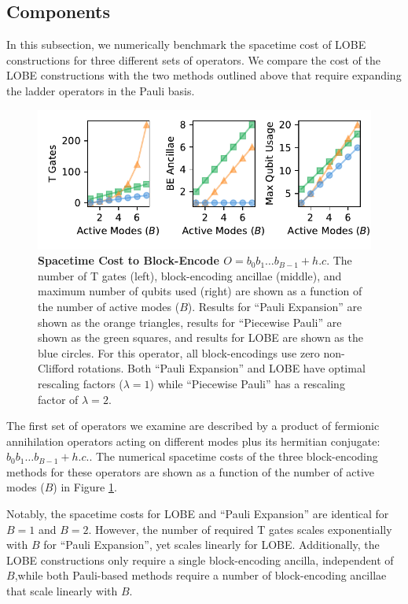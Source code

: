 
\subsection{Components}

In this subsection, we numerically benchmark the spacetime cost of LOBE constructions for three different sets of operators.
We compare the cost of the LOBE constructions with the two methods outlined above that require expanding the ladder operators in the Pauli basis.

\begin{figure}
    \centering
    \includegraphics[width=12cm]{figures/fermionic-hc-comparison.pdf}
    \caption{
        \textbf{Spacetime Cost to Block-Encode $O = b_0 b_1 \hdots b_{B-1} + h.c.$}
        The number of T gates (left), block-encoding ancillae (middle), and maximum number of qubits used (right) are shown as a function of the number of active modes ($B$).
        Results for ``Pauli Expansion'' are shown as the orange triangles, results for ``Piecewise Pauli'' are shown as the green squares, and results for LOBE are shown as the blue circles.
        For this operator, all block-encodings use zero non-Clifford rotations.
        Both ``Pauli Expansion'' and LOBE have optimal rescaling factors ($\lambda = 1$) while ``Piecewise Pauli'' has a rescaling factor of $\lambda = 2$.
    }
    \label{fig:fermionic-hc-comparison}
\end{figure}

The first set of operators we examine are described by a product of fermionic annihilation operators acting on different modes plus its hermitian conjugate: $b_0 b_1 \hdots b_{B-1} + h.c.$.
The numerical spacetime costs of the three block-encoding methods for these operators are shown as a function of the number of active modes ($B$) in Figure \ref{fig:fermionic-hc-comparison}.

Notably, the spacetime costs for LOBE and ``Pauli Expansion'' are identical for $B = 1$ and $B = 2$.
However, the number of required T gates scales exponentially with $B$ for ``Pauli Expansion'', yet scales linearly for LOBE.
Additionally, the LOBE constructions only require a single block-encoding ancilla, independent of $B$,while both Pauli-based methods require a number of block-encoding ancillae that scale linearly with $B$.

